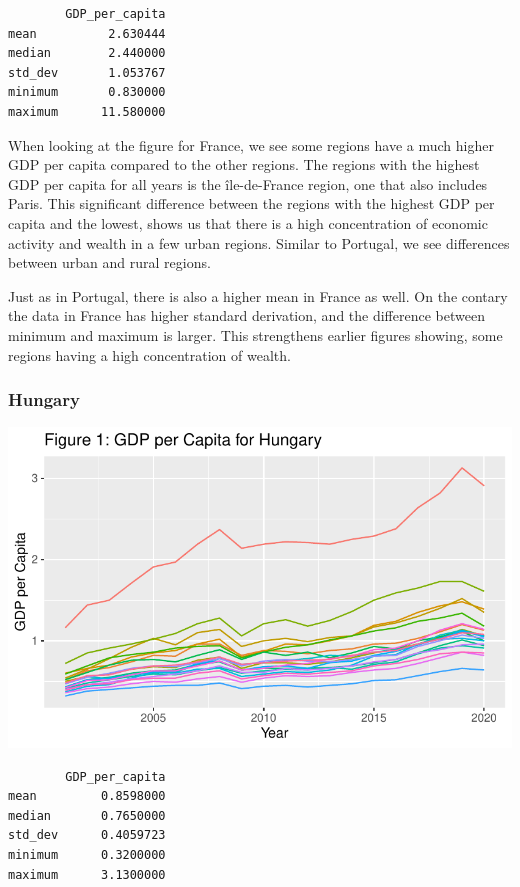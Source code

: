 \documentclass[
  a4paper,
  DIV=11,
  numbers=noendperiod]{scrartcl}
\begin{document}
\begin{verbatim}
        GDP_per_capita
mean          2.630444
median        2.440000
std_dev       1.053767
minimum       0.830000
maximum      11.580000
\end{verbatim}

When looking at the figure for France, we see some regions have a much
higher GDP per capita compared to the other regions. The regions with
the highest GDP per capita for all years is the île-de-France region,
one that also includes Paris. This significant difference between the
regions with the highest GDP per capita and the lowest, shows us that
there is a high concentration of economic activity and wealth in a few
urban regions. Similar to Portugal, we see differences between urban and
rural regions.

Just as in Portugal, there is also a higher mean in France as well. On
the contary the data in France has higher standard derivation, and the
difference between minimum and maximum is larger. This strengthens
earlier figures showing, some regions having a high concentration of
wealth.

\hypertarget{hungary}{%
\subsubsection{Hungary}\label{hungary}}

\includegraphics{MSB104_GR_1_Final_Assignment_research_article_files/figure-pdf/unnamed-chunk-13-1.pdf}

\begin{verbatim}
        GDP_per_capita
mean         0.8598000
median       0.7650000
std_dev      0.4059723
minimum      0.3200000
maximum      3.1300000
\end{verbatim}
\end{document}
